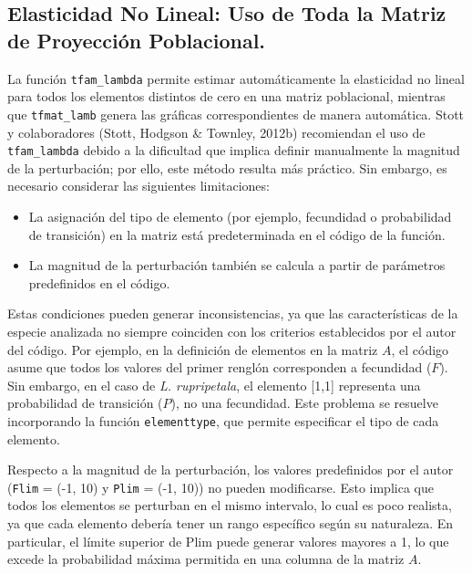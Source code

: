 \documentclass[
  12pt,
  letterpaper,
]{book}
\providecommand{\tightlist}{%
  \setlength{\itemsep}{0pt}\setlength{\parskip}{0pt}}\usepackage{longtable,booktabs,array}
\begin{document}
\subsection{Elasticidad No Lineal: Uso de Toda la Matriz de Proyección
Poblacional.}\label{elasticidad-no-lineal-uso-de-toda-la-matriz-de-proyecciuxf3n-poblacional.}

La función \texttt{tfam\_lambda} permite estimar automáticamente la
elasticidad no lineal para todos los elementos distintos de cero en una
matriz poblacional, mientras que \texttt{tfmat\_lamb} genera las
gráficas correspondientes de manera automática. Stott y colaboradores
(Stott, Hodgson \& Townley, 2012b) recomiendan el uso de
\texttt{tfam\_lambda} debido a la dificultad que implica definir
manualmente la magnitud de la perturbación; por ello, este método
resulta más práctico. Sin embargo, es necesario considerar las
siguientes limitaciones:

\begin{itemize}
\tightlist
\item
  La asignación del tipo de elemento (por ejemplo, fecundidad o
  probabilidad de transición) en la matriz está predeterminada en el
  código de la función.
\item
  La magnitud de la perturbación también se calcula a partir de
  parámetros predefinidos en el código.
\end{itemize}

Estas condiciones pueden generar inconsistencias, ya que las
características de la especie analizada no siempre coinciden con los
criterios establecidos por el autor del código. Por ejemplo, en la
definición de elementos en la matriz \(A\), el código asume que todos
los valores del primer renglón corresponden a fecundidad (\(F\)). Sin
embargo, en el caso de \emph{L. rupripetala}, el elemento {[}1,1{]}
representa una probabilidad de transición (\(P\)), no una fecundidad.
Este problema se resuelve incorporando la función \texttt{elementtype},
que permite especificar el tipo de cada elemento.

Respecto a la magnitud de la perturbación, los valores predefinidos por
el autor (\texttt{Flim} = (-1, 10) y \texttt{Plim} = (-1, 10)) no pueden
modificarse. Esto implica que todos los elementos se perturban en el
mismo intervalo, lo cual es poco realista, ya que cada elemento debería
tener un rango específico según su naturaleza. En particular, el límite
superior de Plim puede generar valores mayores a 1, lo que excede la
probabilidad máxima permitida en una columna de la matriz \(A\).
\end{document}
